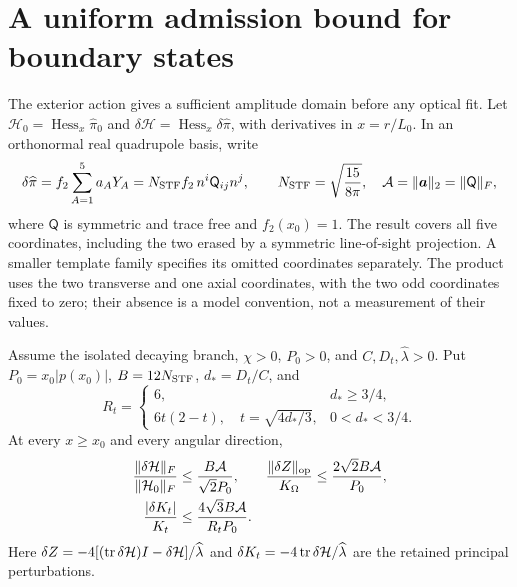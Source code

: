 \section{A uniform admission bound for boundary states}
\label{sec:admission-bound}

The exterior action gives a sufficient amplitude domain before any optical
fit. Let $\mathcal H_0=\operatorname{Hess}_x\widehat\pi_0$ and
$\delta\mathcal H=\operatorname{Hess}_x\delta\widehat\pi$, with derivatives
in $x=r/L_0$. In an orthonormal real quadrupole basis, write
\begin{equation}
 \delta\widehat\pi=f_2\sum_{A=1}^5a_AY_A
 =N_{\rm STF}f_2\,n^i\mathsf Q_{ij}n^j,\qquad
 N_{\rm STF}=\sqrt{\frac{15}{8\pi}},\quad
 \mathcal A=\|\boldsymbol a\|_2=\|\mathsf Q\|_F,
 \label{eq:admission-state}
\end{equation}
where $\mathsf Q$ is symmetric and trace free and $f_2(x_0)=1$.
The result covers all five coordinates, including the two erased by a
symmetric line-of-sight projection. A smaller template family specifies
its omitted coordinates separately. The product uses the two transverse
and one axial coordinates, with the two odd coordinates fixed to zero;
their absence is a model convention, not a measurement of their values.

\begin{proposition}
\label{prop:admission-bound}
Assume the isolated decaying branch, $\chi>0$, $P_0>0$, and
$C,D_t,\widehat\lambda>0$. Put $P_0=x_0|p(x_0)|$,
$B=12N_{\rm STF}$, $d_*=D_t/C$, and
\begin{equation}
 R_t=\begin{cases}
 6,&d_*\ge3/4,\\
 6t(2-t),\quad t=\sqrt{4d_*/3},&0<d_*<3/4.
 \end{cases}
 \label{eq:admission-time-minimum}
\end{equation}
At every $x\ge x_0$ and every angular direction,
\begin{align}
 \frac{\|\delta\mathcal H\|_F}{\|\mathcal H_0\|_F}
 &\le\frac{B\mathcal A}{\sqrt2P_0},&
 \frac{\|\delta Z\|_{\rm op}}{K_\Omega}
 &\le\frac{2\sqrt2B\mathcal A}{P_0},\nonumber\\
 \frac{|\delta K_t|}{K_t}
 &\le\frac{4\sqrt3B\mathcal A}{R_tP_0}.&&
 \label{eq:admission-uniform-bounds}
\end{align}
Here $\delta Z=-4[(\operatorname{tr}\delta\mathcal H)I-\delta\mathcal H]/
\widehat\lambda$ and $\delta K_t=-4\operatorname{tr}\delta\mathcal H/
\widehat\lambda$ are the retained principal perturbations.
\end{proposition}

